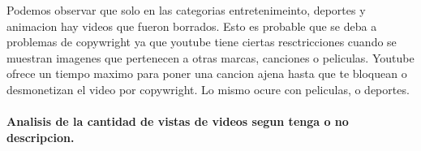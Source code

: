             \begin{figure}[ht]
            \end{figure}
        \FloatBarrier
        Podemos observar que solo en las categorias entretenimeinto, deportes y
        animacion hay videos que fueron borrados. Esto es probable que se deba a
        problemas de copywright ya que youtube tiene ciertas resctricciones cuando
        se muestran imagenes que pertenecen a otras marcas, canciones o peliculas.
        Youtube ofrece un tiempo maximo para poner una cancion ajena hasta que te
        bloquean o desmonetizan el video por copywright. Lo mismo ocure con peliculas,
        o deportes.
        \newpage

        \paragraph{Analisis de la cantidad de vistas de videos segun tenga o no descripcion.}


